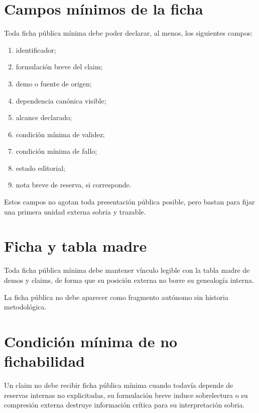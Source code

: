 \section{Campos mínimos de la ficha}
\begin{definition}
Toda ficha pública mínima debe poder declarar, al menos, los siguientes campos:
\begin{enumerate}
  \item identificador;
  \item formulación breve del claim;
  \item demo o fuente de origen;
  \item dependencia canónica visible;
  \item alcance declarado;
  \item condición mínima de validez;
  \item condición mínima de fallo;
  \item estado editorial;
  \item nota breve de reserva, si corresponde.
\end{enumerate}
\end{definition}

\begin{observation}
Estos campos no agotan toda presentación pública posible, pero bastan para fijar una primera unidad externa sobria y trazable.
\end{observation}

\section{Ficha y tabla madre}
\begin{definition}
Toda ficha pública mínima debe mantener vínculo legible con la tabla madre de demos y claims, de forma que su posición externa no borre su genealogía interna.
\end{definition}

\begin{observation}
La ficha pública no debe aparecer como fragmento autónomo sin historia metodológica.
\end{observation}

\section{Condición mínima de no fichabilidad}
\begin{definition}
Un claim no debe recibir ficha pública mínima cuando todavía depende de reservas internas no explicitadas, su formulación breve induce sobrelectura o su compresión externa destruye información crítica para su interpretación sobria.
\end{definition}


